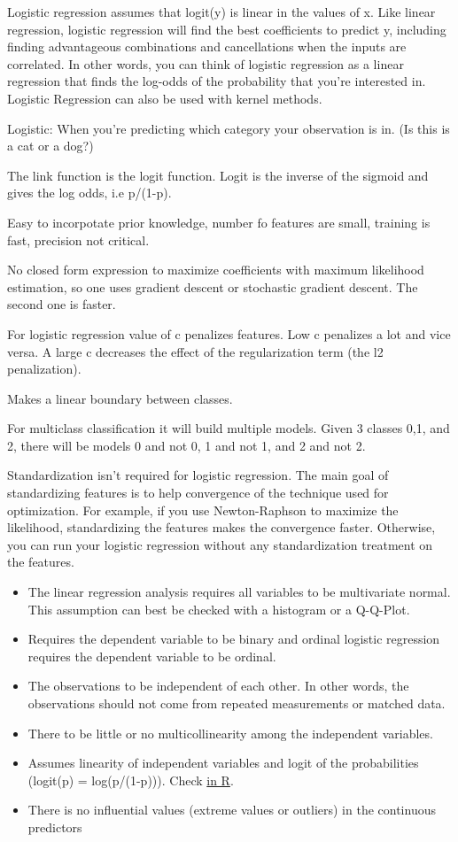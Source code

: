 \documentclass[]{book}
\begin{document}
Logistic regression assumes that logit(y) is linear in the values of x. Like linear regression, logistic regression will find the best coefficients to predict y, including finding advantageous combinations and cancellations when the inputs are correlated. In other words, you can think of logistic regression as a linear regression that finds the log-odds of the probability that you're interested in. Logistic Regression can also be used with kernel methods.

Logistic: When you're predicting which category your observation is in. (Is this is a cat or a dog?)

The link function is the logit function. Logit is the inverse of the sigmoid and gives the log odds, i.e p/(1-p).

Easy to incorpotate prior knowledge, number fo features are small, training is fast, precision not critical.

No closed form expression to maximize coefficients with maximum likelihood estimation, so one uses gradient descent or stochastic gradient descent. The second one is faster.

For logistic regression value of c penalizes features. Low c penalizes a lot and vice versa. A large c decreases the effect of the regularization term (the l2 penalization).

Makes a linear boundary between classes.

For multiclass classification it will build multiple models. Given 3 classes 0,1, and 2, there will be models 0 and not 0, 1 and not 1, and 2 and not 2.

Standardization isn't required for logistic regression. The main goal of standardizing features is to help convergence of the technique used for optimization. For example, if you use Newton-Raphson to maximize the likelihood, standardizing the features makes the convergence faster. Otherwise, you can run your logistic regression without any standardization treatment on the features.

\begin{itemize}
\item
  The linear regression analysis requires all variables to be multivariate normal. This assumption can best be checked with a histogram or a Q-Q-Plot.
\item
  Requires the dependent variable to be binary and ordinal logistic regression requires the dependent variable to be ordinal.
\item
  The observations to be independent of each other. In other words, the observations should not come from repeated measurements or matched data.
\item
  There to be little or no multicollinearity among the independent variables.
\item
  Assumes linearity of independent variables and logit of the probabilities (logit(p) = log(p/(1-p))). Check \href{https://stats.stackexchange.com/questions/169348/how-should-i-check-the-assumption-of-linearity-to-the-logit-for-the-continuous-i}{in R}.
\item
  There is no influential values (extreme values or outliers) in the continuous predictors
\end{itemize}
\end{document}
